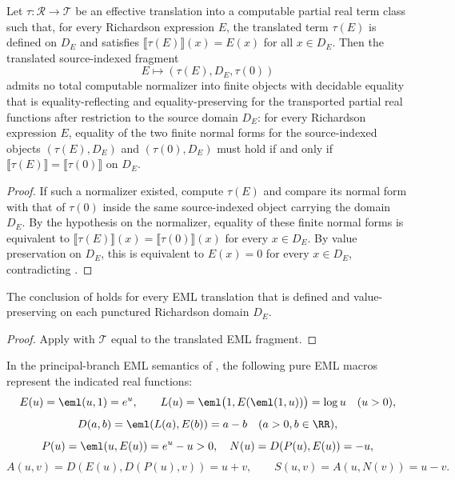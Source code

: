\begin{theorem}
\label{thm:abstract-normalizer-obstruction}
Let \(\tau\colon\mathcal R\to\mathcal T\) be an effective translation into a
computable partial real term class such that, for every Richardson expression
\(E\), the translated term \(\tau(E)\) is defined on \(D_E\) and satisfies
\(\llbracket\tau(E)\rrbracket(x)=E(x)\) for all \(x\in D_E\).  Then the translated
source-indexed fragment
\[
  E\longmapsto (\tau(E),D_E,\tau(0))
\]
admits no total computable normalizer into finite objects with decidable equality
that is equality-reflecting and equality-preserving for the transported partial
real functions after restriction to the source domain \(D_E\): for every
Richardson expression \(E\), equality of the two finite normal forms for the
source-indexed objects \((\tau(E),D_E)\) and \((\tau(0),D_E)\) must hold if and
only if \(\llbracket\tau(E)\rrbracket=\llbracket\tau(0)\rrbracket\) on \(D_E\).
\end{theorem}

\begin{proof}
If such a normalizer existed, compute \(\tau(E)\) and compare its normal form
with that of \(\tau(0)\) inside the same source-indexed object carrying the domain
\(D_E\).  By the hypothesis on the normalizer, equality of these finite normal
forms is equivalent to
\(\llbracket\tau(E)\rrbracket(x)=\llbracket\tau(0)\rrbracket(x)\) for every
\(x\in D_E\).  By value preservation on \(D_E\), this is equivalent to
\(E(x)=0\) for every \(x\in D_E\), contradicting
.
\end{proof}

\begin{lemma}
\label{lem:transported-partial-normalizer-obstruction}
The conclusion of  holds for every EML
translation that is defined and value-preserving on each punctured Richardson
domain \(D_E\).
\end{lemma}

\begin{proof}
Apply  with \(\mathcal T\) equal to the
translated EML fragment.
\end{proof}

\begin{lemma}
\label{lem:eml-printed-core}
In the principal-branch EML semantics of , the following pure EML
macros represent the indicated real functions:
\[
  E(u)=\eml(u,1)=e^u,
  \qquad
  L(u)=\eml\bigl(1,E(\eml(1,u))\bigr)=\log u\quad(u>0),
\]
\[
  D(a,b)=\eml(L(a),E(b))=a-b\quad(a>0,
b\in\RR),
\]
\[
  P(u)=\eml(u,E(u))=e^u-u>0,
  \quad
  N(u)=D(P(u),E(u))=-u,
\]
\[
  A(u,v)=D(E(u),D(P(u),v))=u+v,
  \qquad S(u,v)=A(u,N(v))=u-v .
\]
\end{lemma}

